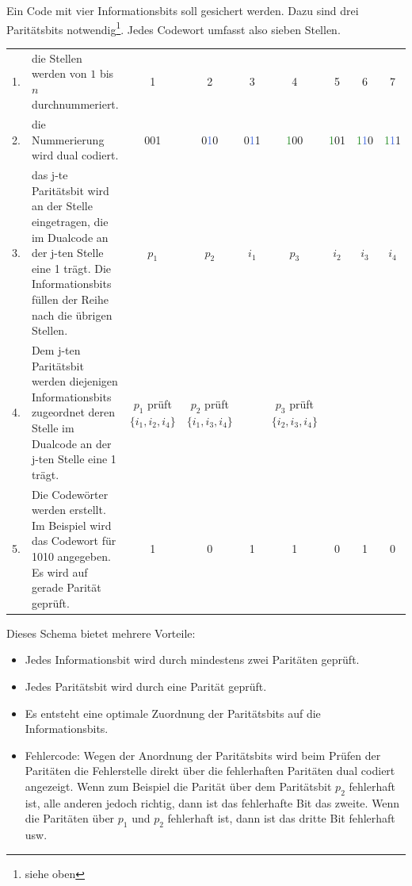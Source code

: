 \documentclass[11pt,a4paper]{scrreprt}
\begin{document}
Ein Code mit vier Informationsbits soll gesichert werden. Dazu sind drei
Paritätsbits notwendig\footnote{siehe oben}. Jedes Codewort umfasst also sieben
Stellen.
\begin{center}
\begin{tabular}{rp{3.6cm}ccccccc}
1. & die Stellen werden von $1$ 
     bis $n$ durchnummeriert.   &  1  &  2  &  3  &  4  &  5  &  6  &  7  \\
2. & die Nummerierung wird
     dual codiert.       & 00\textcolor{BrickRed}{1}
                          & 0\textcolor{RoyalBlue}{1}0 
     					   & 0\textcolor{RoyalBlue}{1}\textcolor{BrickRed}{1} 
						    & \textcolor{ForestGreen}{1}00 
						     & \textcolor{ForestGreen}{1}0\textcolor{BrickRed}{1}
						      & \textcolor{ForestGreen}{1}\textcolor{RoyalBlue}{1}0 
						       & \textcolor{ForestGreen}{1}\textcolor{RoyalBlue}{1}\textcolor{BrickRed}{1} \\
3. & das j-te Paritätsbit wird
     an der Stelle  eingetragen, 
     die im Dualcode an der j-ten Stelle eine 1 trägt. Die
     Informationsbits füllen
     der Reihe nach die 
     übrigen Stellen.           &$p_1$&$p_2$&$i_1$&$p_3$&$i_2$&$i_3$&$i_4$ \\
4. & Dem j-ten Paritätsbit
     werden diejenigen Informationsbits zugeordnet
     deren Stelle  im Dualcode an der j-ten Stelle
     eine 1 trägt. & \parbox[t]{1.5cm}{\centering $p_1$ \\ prüft \\$\{i_1,i_2,i_4\}$}
     & \parbox[t]{1.5cm}{\centering $p_2$ \\ prüft \\ $\{i_1,i_3,i_4\}$}
     & & \parbox[t]{1.5cm}{\centering $p_3$ \\ prüft \\ $\{i_2,i_3,i_4\}$} \\
5. & Die Codewörter werden erstellt.
     Im Beispiel wird das Codewort für 1010 angegeben. 
     Es wird auf gerade Parität geprüft. & 1 & 0 & 1 & 1 & 0 & 1 & 0 \\ 
     
\end{tabular}
\end{center}

Dieses Schema bietet mehrere Vorteile:
\begin{itemize}
\item
	Jedes Informationsbit wird durch mindestens zwei Paritäten geprüft.
\item
	Jedes Paritätsbit wird durch eine Parität geprüft.
\item
	Es entsteht eine optimale Zuordnung der Paritätsbits auf die Informationsbits.
\item
	Fehlercode: Wegen der Anordnung der Paritätsbits wird beim Prüfen der Paritäten die Fehlerstelle direkt über die fehlerhaften Paritäten dual codiert angezeigt. Wenn zum Beispiel die Parität über dem Paritätsbit $p_2$ fehlerhaft ist, alle anderen jedoch richtig, dann ist das fehlerhafte Bit das zweite. Wenn die Paritäten über $p_1$ und $p_2$ fehlerhaft ist, dann ist das dritte Bit fehlerhaft usw.
\end{itemize}
\end{document}

